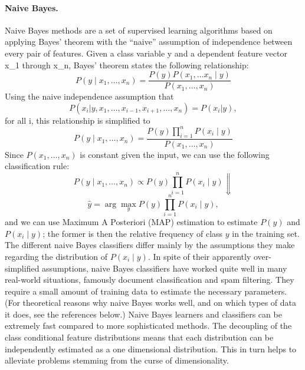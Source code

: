 \paragraph{Naive Bayes.}
\label{naiveBayes}
Naive Bayes methods are a set of supervised learning algorithms based on applying Bayes’ theorem with the “naive” assumption of independence between every pair of features. Given a class variable y and a dependent feature vector x\_1 through x\_n, Bayes’ theorem states the following relationship:
\begin{equation}
P(y \mid x_1, \dots, x_n) = \frac{P(y) P(x_1, \dots x_n \mid y)}
                                 {P(x_1, \dots, x_n)}
\end{equation}
Using the naive independence assumption that
\begin{equation}
P(x_i | y, x_1, \dots, x_{i-1}, x_{i+1}, \dots, x_n) = P(x_i | y),
\end{equation}
for all i, this relationship is simplified to
\begin{equation}
P(y \mid x_1, \dots, x_n) = \frac{P(y) \prod_{i=1}^{n} P(x_i \mid y)}
                                 {P(x_1, \dots, x_n)}
\end{equation}
Since $P(x_1, \dots, x_n)$ is constant given the input, we can use the following classification rule:
\begin{equation}
P(y \mid x_1, \dots, x_n) \propto P(y) \prod_{i=1}^{n} P(x_i \mid y)
\Downarrow
\end{equation}
\begin{equation}
\hat{y} = \arg\max_y P(y) \prod_{i=1}^{n} P(x_i \mid y),
\end{equation}
and we can use Maximum A Posteriori (MAP) estimation to estimate $P(y)$ and $P(x_i \mid y)$; the former is then the relative frequency of class $y$ in the training set.
The different naive Bayes classifiers differ mainly by the assumptions they make regarding the distribution of $P(x_i \mid y)$.
In spite of their apparently over-simplified assumptions, naive Bayes classifiers have worked quite well in many real-world situations, famously document classification and spam filtering. They require a small amount of training data to estimate the necessary parameters. (For theoretical reasons why naive Bayes works well, and on which types of data it does, see the references below.)
Naive Bayes learners and classifiers can be extremely fast compared to more sophisticated methods. The decoupling of the class conditional feature distributions means that each distribution can be independently estimated as a one dimensional distribution. This in turn helps to alleviate problems stemming from the curse of dimensionality.
